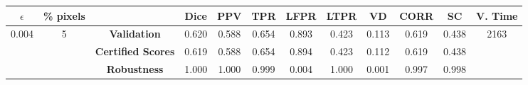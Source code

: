 \begin{longtable}{ c  c | c | c  c  c  c  c  c  c c c}
\toprule \textbf{$\epsilon$} & \textbf{\% pixels} & & \textbf{Dice} & \textbf{PPV} & \textbf{TPR} & \textbf{LFPR} & \textbf{LTPR} & \textbf{VD} & \textbf{CORR} & \textbf{SC} & \textbf{V. Time} \\
\midrule 
\multirow{3}{*}{0.004}  & \multirow{3}{*}{5} &\textbf{Validation} & 0.620 & 0.588 & 0.654 & 0.893 & 0.423 & 0.113 & 0.619 & 0.438 & \multirow{3}{*}{2163} \\
 & & \textbf{Certified Scores} & 0.619 & 0.588 & 0.654 & 0.894 & 0.423 & 0.112 & 0.619 & 0.438 & \\
& & \textbf{Robustness} & 1.000 & 1.000 & 0.999 & 0.004 & 1.000 & 0.001 & 0.997 & 0.998 & \\
\end{longtable}